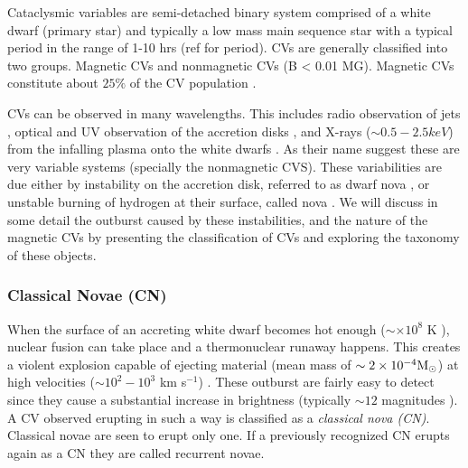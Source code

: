 Cataclysmic variables are semi-detached binary system comprised of a white dwarf (primary star) and typically a low mass main sequence star with a typical period in the range of 1-10 hrs (ref for period). CVs are generally classified into two groups. Magnetic CVs and nonmagnetic CVs (B < 0.01 MG). Magnetic CVs constitute about $25 \%$ of the CV population \citep{balman_x-ray_2012}. 

CVs can be observed in many wavelengths. This includes radio observation of jets \cite{nova_jets_2008,coppejans_novalike_2015}, optical and UV observation of the accretion disks \cite{1994ASPC...54...61K}, and X-rays ($\sim 0.5-2.5 keV$) from the infalling plasma onto the white dwarfs \citep{kuulkers_x-rays_2006}. As their name suggest these are very variable systems (specially the nonmagnetic CVS). These variabilities are due either by instability on the accretion disk, referred to as dwarf nova \citep{osaki_accretion_1974}, or unstable burning of hydrogen at their surface, called nova \citep{starrfield_thermonuclear_2016}. We will discuss in some detail the outburst caused by these instabilities, and the nature of the magnetic CVs by presenting the classification of CVs and exploring the taxonomy of these objects.  

\subsubsection{Classical Novae (CN)}

When the surface of an accreting white dwarf becomes hot enough ($\sim \times 10^8$ K \cite{starrfield_thermonuclear_2016}), nuclear fusion can take place and a thermonuclear runaway happens. This creates a violent explosion capable of ejecting material (mean mass of $\sim 2 \times 10^{-4} \text M_\odot$) at high velocities ($\sim 10^2 - 10^3$ km s$^{-1}$) \citep{gehrz_nucleosynthesis_1998,shara_recent_1989}. These outburst are fairly easy to detect since they cause a substantial increase in brightness (typically $\sim 12$ magnitudes \cite{shara_recent_1989}). A CV observed erupting in such a way is classified as a \emph{classical nova (CN)}. Classical novae are seen to erupt only one. If a previously recognized CN erupts again as a CN they are called recurrent novae. 



